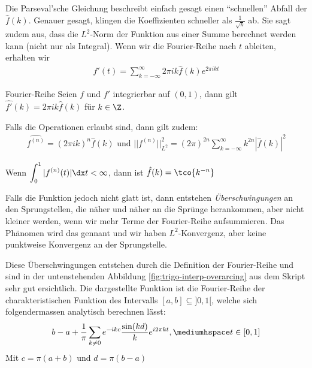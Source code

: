 
\inlineremark Die Parseval'sche Gleichung beschreibt einfach gesagt einen ``schnellen'' Abfall der $\hat{f}(k)$.
Genauer gesagt, klingen die Koeffizienten schneller als $\frac{1}{\sqrt{k}}$ ab.
Sie sagt zudem aus, dass die $L^2$-Norm der Funktion aus einer Summe berechnet werden kann (nicht nur als Integral).
Wenn wir die Fourier-Reihe nach $t$ ableiten, erhalten wir
\rmvspace
\begin{align*}
    f'(t) = \sum_{k = -\infty}^{\infty} 2\pi ik\hat{f}(k)e^{2\pi ikt}
\end{align*}

\begin{theorem}[]{Fourier-Reihe}
    Seien $f$ und $f'$ integrierbar auf $(0, 1)$, dann gilt $\hat{f'}(k) = 2\pi ik\hat{f}(k)$ für $k \in \Z$.

    Falls die Operationen erlaubt sind, dann gilt zudem:
    \rmvspace
    \begin{align*}
        \hat{f^{(n)}} = (2\pi ik)^n \hat{f}(k) \text{ und } ||f^{(n)}||_{L^2}^2 = (2\pi)^{2n} \sum_{k = -\infty}^{\infty} k^{2n} |\hat{f}(k)|^2
    \end{align*}
\end{theorem}


\inlinetheorem Wenn $\displaystyle \int_{0}^{1} |f^{(n)}(t)|\dx t < \infty$, dann ist $\hat{f}(k) = \tco{k^{-n}}$

Falls die Funktion jedoch nicht glatt ist, dann entstehen \textit{Überschwingungen} an den Sprungstellen, die näher und näher an die Sprünge herankommen, aber nicht kleiner werden, wenn wir mehr Terme der Fourier-Reihe aufsummieren.
Das Phänomen wird das  gennant und wir haben $L^2$-Konvergenz, aber keine punktweise Konvergenz an der Sprungstelle.

\inlineremark
Diese Überschwingungen entstehen durch die Definition der Fourier-Reihe und sind in der untenstehenden Abbildung \ref{fig:trigo-interp-overarcing} aus dem Skript sehr gut ersichtlich.
Die dargestellte Funktion ist die Fourier-Reihe der charakteristischen Funktion des Intervalls $[a, b] \subseteq ]0, 1[$, welche sich folgendermassen analytisch berechnen lässt:
\begin{align*}
    b - a + \frac{1}{\pi} \sum_{k \neq 0} e^{-ikc}\frac{\sin(kd)}{k} e^{i2\pi kt}, \mediumhspace t \in [0, 1]
\end{align*}
Mit $c = \pi(a + b)$ und $d = \pi(b - a)$

